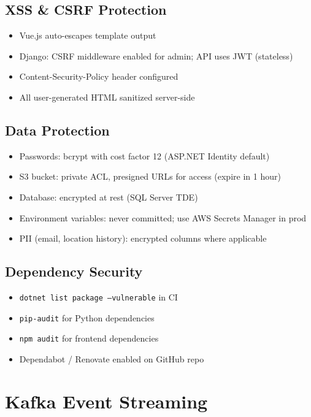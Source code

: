 \documentclass[12pt,letterpaper]{article}
\begin{document}
\subsection{XSS \& CSRF Protection}
\begin{itemize}
  \item Vue.js auto-escapes template output
  \item Django: CSRF middleware enabled for admin; API uses JWT (stateless)
  \item Content-Security-Policy header configured
  \item All user-generated HTML sanitized server-side
\end{itemize}

\subsection{Data Protection}
\begin{itemize}
  \item Passwords: bcrypt with cost factor 12 (ASP.NET Identity default)
  \item S3 bucket: private ACL, presigned URLs for access (expire in 1 hour)
  \item Database: encrypted at rest (SQL Server TDE)
  \item Environment variables: never committed; use AWS Secrets Manager in prod
  \item PII (email, location history): encrypted columns where applicable
\end{itemize}

\subsection{Dependency Security}
\begin{itemize}
  \item \texttt{dotnet list package --vulnerable} in CI
  \item \texttt{pip-audit} for Python dependencies
  \item \texttt{npm audit} for frontend dependencies
  \item Dependabot / Renovate enabled on GitHub repo
\end{itemize}

\newpage

\section{Kafka Event Streaming}
\end{document}
